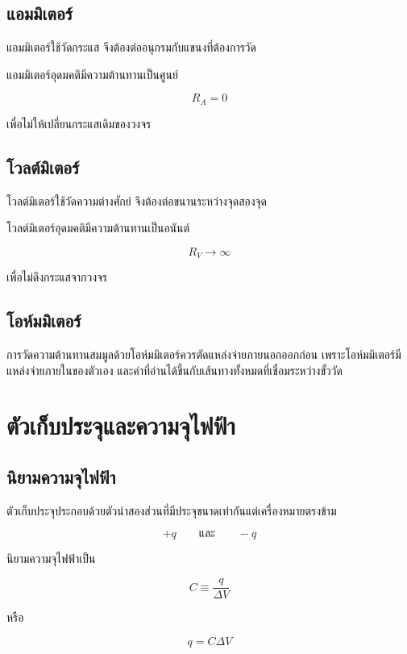 \subsection{แอมมิเตอร์}

แอมมิเตอร์ใช้วัดกระแส จึงต้องต่ออนุกรมกับแขนงที่ต้องการวัด

แอมมิเตอร์อุดมคติมีความต้านทานเป็นศูนย์

\[
R_A=0
\]

เพื่อไม่ให้เปลี่ยนกระแสเดิมของวงจร

\subsection{โวลต์มิเตอร์}

โวลต์มิเตอร์ใช้วัดความต่างศักย์ จึงต้องต่อขนานระหว่างจุดสองจุด

โวลต์มิเตอร์อุดมคติมีความต้านทานเป็นอนันต์

\[
R_V\to\infty
\]

เพื่อไม่ดึงกระแสจากวงจร

\subsection{โอห์มมิเตอร์}

การวัดความต้านทานสมมูลด้วยโอห์มมิเตอร์ควรตัดแหล่งจ่ายภายนอกออกก่อน เพราะโอห์มมิเตอร์มีแหล่งจ่ายภายในของตัวเอง และค่าที่อ่านได้ขึ้นกับเส้นทางทั้งหมดที่เชื่อมระหว่างขั้ววัด

\section{ตัวเก็บประจุและความจุไฟฟ้า}

\subsection{นิยามความจุไฟฟ้า}

ตัวเก็บประจุประกอบด้วยตัวนำสองส่วนที่มีประจุขนาดเท่ากันแต่เครื่องหมายตรงข้าม

\[
+q\qquad\text{และ}\qquad -q
\]

นิยามความจุไฟฟ้าเป็น

\begin{tcolorbox}[title={นิยามความจุไฟฟ้า}]
\[
\boxed{C\equiv\frac{q}{\Delta V}}
\]

หรือ

\[
\boxed{q=C\Delta V}
\]
\end{tcolorbox}

